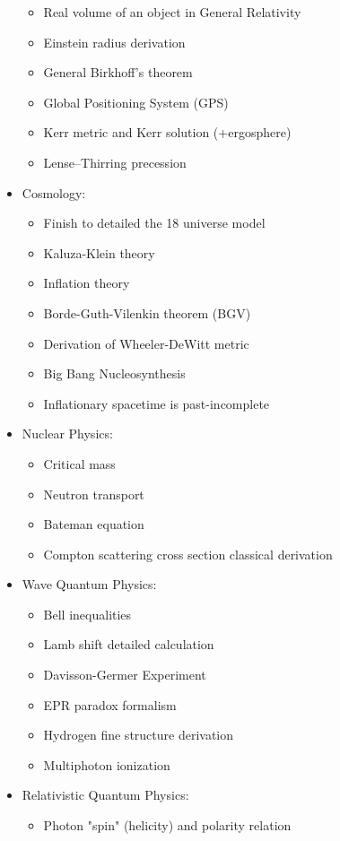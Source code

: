 \begin{itemize}
\begin{itemize}
				\item Real volume of an object in General Relativity
				\item Einstein radius derivation
				\item General Birkhoff's theorem
				\item Global Positioning System (GPS)
				\item Kerr metric and Kerr solution (+ergosphere)
				\item Lense–Thirring precession	
			\end{itemize}
		\item Cosmology:
			\begin{itemize}
				\item Finish to detailed the 18 universe model
				\item Kaluza-Klein theory
				\item Inflation theory
				\item Borde-Guth-Vilenkin theorem (BGV)
				\item Derivation of Wheeler-DeWitt metric
				\item Big Bang Nucleosynthesis
				\item Inflationary spacetime is past-incomplete
			\end{itemize}
		\item Nuclear Physics:
			\begin{itemize}
				\item Critical mass
				\item Neutron transport
				\item Bateman equation
				\item Compton scattering cross section classical derivation
			\end{itemize}
		\item Wave Quantum Physics:
			\begin{itemize}
				\item Bell inequalities
				\item Lamb shift detailed calculation
				\item Davisson-Germer Experiment
				\item EPR paradox formalism
				\item Hydrogen fine structure derivation
				\item Multiphoton ionization
			\end{itemize}
		\item Relativistic Quantum Physics:
			\begin{itemize}
				\item Photon "spin" (helicity) and polarity relation

\end{itemize}
\end{itemize}
